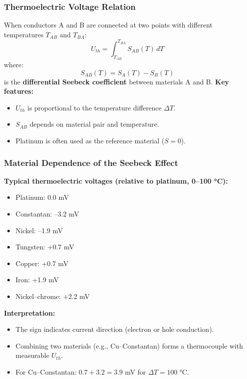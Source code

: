 \begin{frame}
	\frametitle{Thermoelectric Voltage Relation}
    \small
    When conductors A and B are connected at two points with different temperatures $T_{AB}$ and $T_{BA}$:
    \begin{equation}
        U_{th} = \int_{T_{AB}}^{T_{BA}} S_{AB}(T) \, dT
    \end{equation}
    where:
    \begin{equation}
        S_{AB}(T) = S_A(T) - S_B(T)
    \end{equation}
    is the \textbf{differential Seebeck coefficient} between materials A and B.
    \textbf{Key features:}
    \begin{itemize}
        \item $U_{th}$ is proportional to the temperature difference $\Delta T$.
        \item $S_{AB}$ depends on material pair and temperature.
        \item Platinum is often used as the reference material ($S=0$).
    \end{itemize}
\end{frame}

\begin{frame}
	\frametitle{Material Dependence of the Seebeck Effect}
    \small
    \textbf{Typical thermoelectric voltages (relative to platinum, 0–100 °C):}
    \begin{itemize}
        \item Platinum: 0.0 mV
        \item Constantan: –3.2 mV
        \item Nickel: –1.9 mV
        \item Tungsten: +0.7 mV
        \item Copper: +0.7 mV
        \item Iron: +1.9 mV
        \item Nickel–chrome: +2.2 mV
    \end{itemize}
    \textbf{Interpretation:}
    \begin{itemize}
        \item The sign indicates current direction (electron or hole conduction).
        \item Combining two materials (e.g., Cu–Constantan) forms a thermocouple with measurable $U_{th}$.
        \item For Cu–Constantan: $0.7 + 3.2 = 3.9$ mV for $\Delta T = 100$ °C.
    \end{itemize}
\end{frame}

